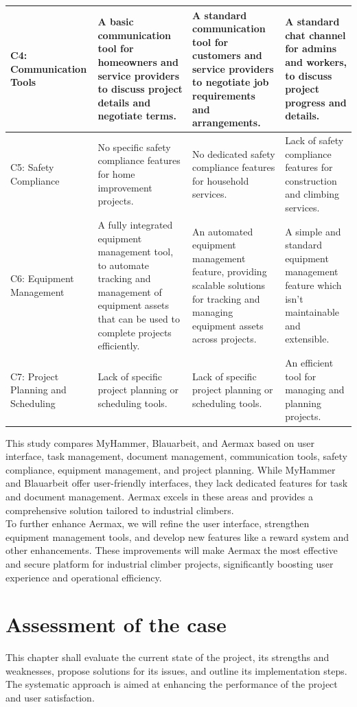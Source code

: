 \begin{longtable}{|p{2cm}|p{3.5cm}|p{3.5cm}|p{3.5cm}|}
    C4: Communication Tools & A basic communication tool for homeowners and service providers to discuss project details and negotiate terms. & A standard communication tool for customers and service providers to negotiate job requirements and arrangements. & A standard chat channel for admins and workers, to discuss project progress and details. \\
    \hline
    C5: Safety Compliance & No specific safety compliance features for home improvement projects. & No dedicated safety compliance features for household services. & Lack of safety compliance features for construction and climbing services. \\
    \hline
    C6: Equipment Management & A fully integrated equipment management tool, to automate tracking and  management of equipment assets that can be used to complete projects efficiently. & An automated equipment management feature, providing scalable solutions for tracking and managing equipment assets across projects. & A simple and standard equipment management feature which isn’t maintainable and extensible.\\
    \hline
    C7: Project Planning and Scheduling & Lack of specific project planning or scheduling tools. & Lack of specific project planning or scheduling tools. & An efficient tool for managing and planning projects. \\
    \hline
\end{longtable}
This study compares MyHammer, Blauarbeit, and Aermax based on user interface, task management, document management, communication tools, safety compliance, equipment management, and project planning. While MyHammer and Blauarbeit offer user-friendly interfaces, they lack dedicated features for task and document management. Aermax excels in these areas and provides a comprehensive solution tailored to industrial climbers.\\
To further enhance Aermax, we will refine the user interface, strengthen equipment management tools, and develop new features like a reward system and other enhancements. These improvements will make Aermax the most effective and secure platform for industrial climber projects, significantly boosting user experience and operational efficiency.
\section{Assessment of the case}
This chapter shall evaluate the current state of the project, its strengths and weaknesses, propose solutions for its issues, and outline its implementation steps. The systematic approach is aimed at enhancing the performance of the project and user satisfaction.


